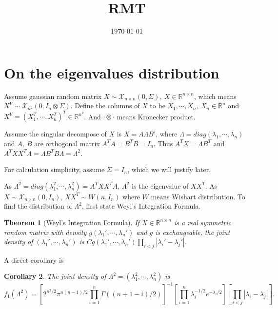 \documentclass[12pt, a4paper, oneside]{article}
\title{\textbf{RMT}}
\date{\today}
\newtheorem{theorem}{Theorem}[section]
\newtheorem{corollary}[theorem]{Corollary}
\begin{document}
\maketitle
\setcounter{page}{1}
\section{On the eigenvalues distribution}
    Assume gaussian random matrix $X\sim\mathcal{X}_{n\times n}(0,\Sigma),\ X\in\mathbb{R}^{n\times n}$, which means $X^V\sim\mathcal{X}_{n^2}(0,I_n\otimes\Sigma)$. Define the columns of $X$ to be $X_1,\cdots,X_n,\ X_n\in\mathbb{R}^n$ and $X^V=(X_1^T,\cdots,X_n^T)^T\in\mathbb{R}^{n^2}$. And $\cdot\otimes\cdot$ means Kronecker product.


    Assume the singular decompose of $X$ is $X=A\Lambda B'$, where $\Lambda=diag(\lambda_1,\cdots,\lambda_n)$ and $A,\ B$ are orthogonal matrix $A^TA=B^TB=I_n$. Thus $A^TX=\Lambda B^T$ and $A^TXX^TA=\Lambda B^TB\Lambda=\Lambda^2$.


    For calculation simplicity, assume $\Sigma=I_n$, which we will justify later.


    As $\Lambda^2=diag(\lambda_1^2,\cdots,\lambda_n^2)=A^TXX^TA$, $\Lambda^2$ is the eigenvalue of $XX^T$. As $X\sim\mathcal{X}_{n\times n}(0,I_n)$, $XX^T\sim W(n,I_n)$ where $W$ means Wishart distribution. To find the distribution of $\Lambda^2$, first state Weyl's Integration Formula\cite{brocker2013representations}.
    \begin{theorem}[Weyl's Integration Formula]
        If $X\in\mathbb{R}^{n\times n}$ is a real symmetric random matrix with density $g(\lambda_1',\cdots,\lambda_n')$ and $g$ is exchangeable, the joint density of $(\lambda_1',\cdots,\lambda_n')$ is $Cg(\lambda_1',\cdots,\lambda_n')\overset{}{\underset{i<j}{\prod}}|\lambda_i'-\lambda_j'|$.
    \end{theorem}
    A direct corollary is
    \begin{corollary}
        The joint density of $\Lambda^2=(\lambda_1^2,\cdots,\lambda_n^2)$ is
        \begin{equation*}
            f_1(\Lambda^2)=\left[ 2^{n^2/2}\pi^{n(n-1)/2}\overset{n}{\underset{i=1}{\prod}}\Gamma((n+1-i)/2) \right]^{-1}\left[ \overset{n}{\underset{i=1}{\prod}}\lambda_i^{-1/2}e^{-\lambda_i/2} \right]\left[ \overset{}{\underset{i<j}{\prod}}|\lambda_i-\lambda_j| \right].
        \end{equation*} 
    \end{corollary}
\end{document}
